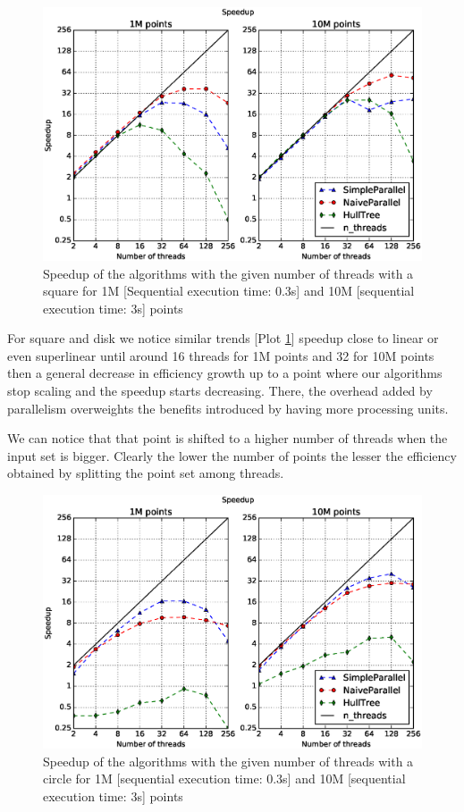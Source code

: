 \documentclass[letterpaper]{article}
\begin{document}
\begin{figure}[!ht]\centering
  \includegraphics[scale=0.33]{./plots/speedup_xeon_square_fixed_points.eps}
  \caption{Speedup of the algorithms with the given number of threads with a square for 1M [Sequential execution time: 0.3s] and 10M [sequential execution time: 3s] points\label{Threads speedup square}}
\end{figure}

For square and disk we notice similar trends [Plot \ref{Threads speedup square}] speedup close to linear or even superlinear until around 16 threads for 1M points and 32 for 10M points then a general decrease in efficiency growth up to a point where our algorithms stop scaling and the speedup starts decreasing.
There, the overhead added by parallelism overweights the benefits introduced by having more processing units.

We can notice that that point is shifted to a higher number of threads when the input set is bigger. Clearly the lower the number of points the lesser the efficiency obtained by splitting the point set among threads.

\begin{figure}[!ht]\centering
  \includegraphics[scale=0.33]{./plots/speedup_xeon_circle_fixed_points.eps}
  \caption{Speedup of the algorithms with the given number of threads with a circle for 1M [sequential execution time: 0.3s] and 10M [sequential execution time: 3s] points\label{Threads speedup circle}}
\end{figure}
\end{document}
